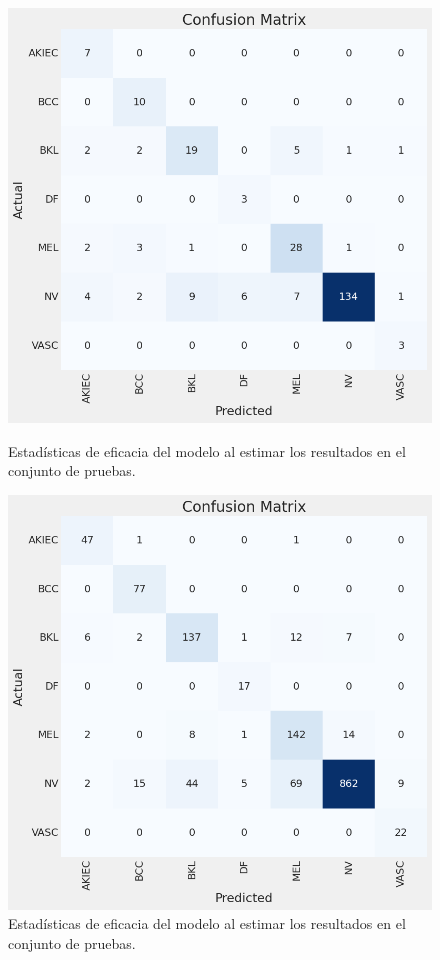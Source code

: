 \begin{figure}[ht]
    \centering
    \begin{minipage}{0.45\textwidth}
        \centering
        \includegraphics[width=\textwidth]{./Graphics/confussionmatrix_p1.png}
        \caption{Estadísticas de eficacia del modelo al estimar los resultados en el conjunto de pruebas.}
        \label{fig:confussion_matrix_p1}
    \end{minipage}\hfill
    \begin{minipage}{0.45\textwidth}
        \centering
        \includegraphics[width=\textwidth]{./Graphics/confussionMatrix_p3.png}
        \caption{Estadísticas de eficacia del modelo al estimar los resultados en el conjunto de pruebas.}
        \label{fig:confussion_matrix_p3}
    \end{minipage}
\end{figure}

